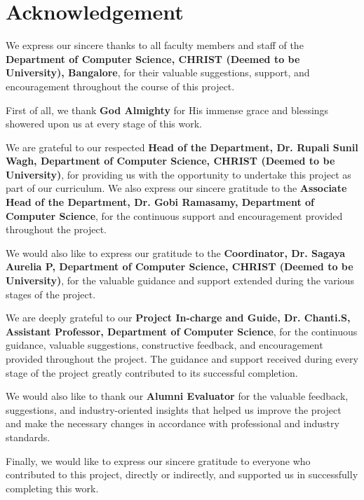 \documentclass[
12pt,
a4paper,
oneside
]{report}
\begin{document}

\chapter*{Acknowledgement}

We express our sincere thanks to all faculty members and staff of the
\textbf{Department of Computer Science, CHRIST (Deemed to be University),
Bangalore}, for their valuable suggestions, support, and encouragement
throughout the course of this project.

First of all, we thank \textbf{God Almighty} for His immense grace and blessings
showered upon us at every stage of this work.

We are grateful to our respected \textbf{Head of the Department, Dr. Rupali
Sunil Wagh, Department of Computer Science, CHRIST (Deemed to be University)},
for providing us with the opportunity to undertake this project as part of our
curriculum. We also express our sincere gratitude to the \textbf{Associate Head
of the Department, Dr. Gobi Ramasamy, Department of Computer Science}, for the
continuous support and encouragement provided throughout the project.

We would also like to express our gratitude to the \textbf{Coordinator,
Dr. Sagaya Aurelia P, Department of Computer Science, CHRIST (Deemed to be
University)}, for the valuable guidance and support extended during the various
stages of the project.

We are deeply grateful to our \textbf{Project In-charge and Guide, Dr. Chanti.S,
Assistant Professor, Department of Computer Science}, for the continuous
guidance, valuable suggestions, constructive feedback, and encouragement
provided throughout the project. The guidance and support received during every
stage of the project greatly contributed to its successful completion.

We would also like to thank our \textbf{Alumni Evaluator} for the valuable
feedback, suggestions, and industry-oriented insights that helped us improve the
project and make the necessary changes in accordance with professional and
industry standards.

Finally, we would like to express our sincere gratitude to everyone who
contributed to this project, directly or indirectly, and supported us in
successfully completing this work.
\end{document}
